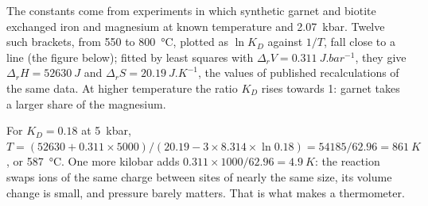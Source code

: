 The constants come from experiments in which synthetic garnet and biotite exchanged iron
and magnesium at known temperature and \qty{2.07}{kbar}. Twelve such brackets, from 550 to
\qty{800}{\celsius}, plotted as $\ln K_D$ against $1/T$, fall close to a line (the figure
below); fitted by least squares with $\Delta_r V = \qty{0.311}{J.bar^{-1}}$, they give
$\Delta_r H = \qty{52630}{J}$ and $\Delta_r S = \qty{20.19}{J.K^{-1}}$, the values of
published recalculations of the same data. At higher temperature the ratio $K_D$ rises
towards 1: garnet takes a larger share of the magnesium.

\begin{omfigure}
\centering
{}
\par{}
\end{omfigure}

For $K_D = 0.18$ at \qty{5}{kbar}, $T = (52630 + 0.311\times5000)/(20.19 - 3\times8.314
\times\ln 0.18) = 54185/62.96 = \qty{861}{K}$, or \qty{587}{\celsius}. One more kilobar
adds $0.311\times1000/62.96 = \qty{4.9}{K}$: the reaction swaps ions of the same charge
between sites of nearly the same size, its volume change is small, and pressure barely
matters. That is what makes a thermometer.

